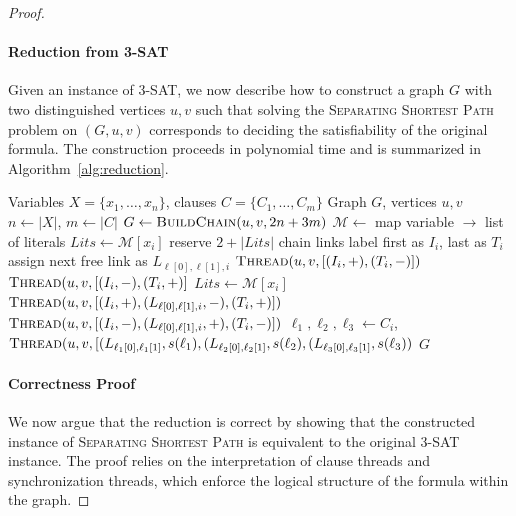 \documentclass[journal ]{new-aiaa}
\numberwithin{equation}{section}
\theoremstyle{definition}
\theoremstyle{plain}
\theoremstyle{remark}
\begin{document}
\begin{proof}
 
\paragraph{Reduction from 3-SAT}
Given an instance of \textsc{3-SAT}, we now describe how to construct a graph $G$ with two distinguished vertices $u,v$ such that solving the \textsc{Separating Shortest Path} problem on $(G,u,v)$ corresponds to deciding the satisfiability of the original formula.  
The construction proceeds in polynomial time and is summarized in Algorithm~\ref{alg:reduction}.


\begin{algorithm}[H]
\caption{Reduction from \textsc{3-SAT} to \textsc{Separating Shortest Path}}
\label{alg:reduction}
\begin{algorithmic}[1]
\Require Variables $X=\{x_1,\dots,x_n\}$, clauses $C=\{C_1,\dots,C_m\}$
\Ensure Graph $G$, vertices $u,v$
\State $n \gets |X|$, $m \gets |C|$
\State $G \gets \textsc{BuildChain}(u,v,2n+3m)$
\State $\mathcal{M} \gets$ map variable $\to$ list of literals
    \State $Lits \gets \mathcal{M}[x_i]$
    \State reserve $2+|Lits|$ chain links
    \State label first as $I_i$, last as $T_i$
        \State assign next free link as $L_{\ell[0],\ell[1],i}$
    \EndFor
\EndFor
{}
    \State $\textsc{Thread}(u,v,[(I_i,+),(T_i,-)])$
    \State $\textsc{Thread}(u,v,[(I_i,-),(T_i,+)]$
    \State $Lits \gets \mathcal{M}[x_i]$
        \State $\textsc{Thread}(u,v,[(I_i,+),(L_{\ell[0],\ell[1],i},-),(T_i,+)])$
        \State $\textsc{Thread}(u,v,[(I_i,-),(L_{\ell[0],\ell[1],i},+),(T_i,-)])$
    \EndFor
\EndFor
{}
    \State $\ell_1,\ell_2,\ell_3 \gets C_i$,
    \State $\textsc{Thread}(u,v,[(L_{\ell_1[0],\ell_1[1]},s(\ell_1),(L_{\ell_2[0],\ell_2[1]},s(\ell_2),(L_{\ell_3[0],\ell_3[1]},s(\ell_3))$
\EndFor
\State \Return $G$
\end{algorithmic}
\end{algorithm}
\paragraph{Correctness Proof}
We now argue that the reduction is correct by showing that the constructed instance of \textsc{Separating Shortest Path} is equivalent to the original \textsc{3-SAT} instance.  
The proof relies on the interpretation of clause threads and synchronization threads, which enforce the logical structure of the formula within the graph.


\end{proof}
\end{document}
